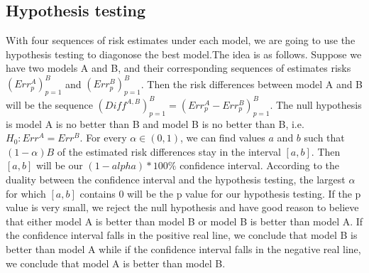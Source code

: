 \documentclass[12pt]{article}
\begin{document}
\subsection{Hypothesis testing}
With four sequences of risk estimates under each model, we are going to use the hypothesis testing to diagonose the best model.The idea is as follows. Suppose we have two models A and B, and their corresponding sequences of estimates risks $(Err^A_{p})_{p=1}^{B}$ and $(Err^B_{p})_{p=1}^{B}$. Then the risk differences between model A and B will be the sequence $(Diff^{A,B})_{p=1}^{B}=(Err^A_{p}-Err^B_{p})_{p=1}^{B}$. The null hypothesis is model A is no better than B and model B is no better than B, i.e. $H_0: Err^A=Err^B$. For every $\alpha\in (0,1)$, we can find values $a$ and $b$ such that $(1-\alpha)B$ of the estimated risk differences stay in the interval $[a,b]$. Then $[a,b]$ will be our $(1-alpha)*100\%$ confidence interval. According to the duality between the confidence interval and the hypothesis testing, the largest $\alpha$ for which $[a,b]$ contains 0 will be the p value for our hypothesis testing. If the p value is very small, we reject the null hypothesis and have good reason to believe that either model A is better than model B or model B is better than model A.  If the confidence interval falls in the positive real line, we conclude that model B is better than model A while if the confidence interval falls in the negative real line, we conclude that model A is better than model B.
\end{document}
